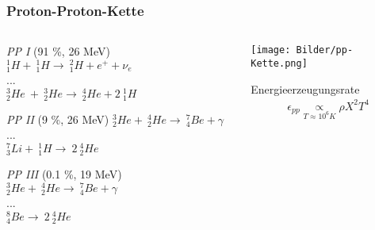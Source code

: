 \documentclass{beamer}
\begin{document}
\begin{frame}
  \frametitle{Proton-Proton-Kette}
  

\begin{columns}[t]

\begin{column}{.48\textwidth}

\tiny{

\begin{block}{\textit{PP I} (91 \%, 26 MeV)}
$
^1_1H + \ ^1_1H \to \ ^2_1H + e^+ + \nu_e$\\[0.1cm]...\\[0.1cm]
$^3_2He \ + \ ^3_2He \to \ ^4_2He + 2 \ ^1_1H
$
\end{block}

\begin{block}{\textit{PP II} (9 \%, 26 MeV)}
$^3_2He + \ ^4_2He \to \ ^7_4Be + \gamma$\\[0.1cm]...\\[0.1cm]
$^7_3Li + \ ^1_1H \to \ 2 \ ^4_2He
$
\end{block}

\begin{block}{\textit{PP III} (0.1 \%, 19 MeV)}
$^3_2He + \ ^4_2He \to \ ^7_4Be + \gamma$\\ 
[0.1cm]...\\[0.1cm]
$^8_4Be \to \ 2 \ ^4_2He
$
\end{block}

}

\end{column}

\begin{column}{.48\textwidth}

\centering
\texttt{[image: Bilder/pp-Kette.png]}

\begin{block}{Energieerzeugungsrate}
\begin{align*}
\epsilon_{pp} \underset{T \approx 10^6 K}{\propto} \rho X^2 T^4
\end{align*}

\end{block}

\end{column}

\end{columns}

\end{frame}
\end{document}
